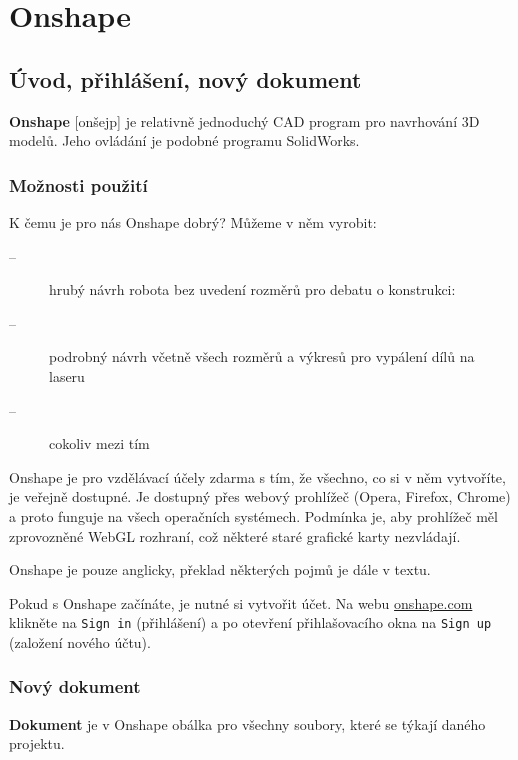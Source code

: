 
\section{Onshape} \label{onshape}

\subsection{Úvod, přihlášení, nový dokument}

\textbf{Onshape} 
 [onšejp] je relativně jednoduchý CAD program pro navrhování 3D modelů. Jeho ovládání je podobné programu SolidWorks. 
 
 \subsubsection{Možnosti použití}
 
 K čemu je pro nás Onshape dobrý? Můžeme v něm vyrobit: 
 
 \begin{description}
 	\item[--] hrubý návrh robota bez uvedení rozměrů pro debatu o konstrukci: 
 	\item[--] podrobný návrh včetně všech rozměrů a výkresů pro vypálení dílů na laseru  
 	\item[--] cokoliv mezi tím
 \end{description}
 
 
Onshape je pro vzdělávací účely zdarma s tím, že všechno, co si v něm vytvoříte, je veřejně dostupné. 
Je dostupný přes webový prohlížeč (Opera, Firefox, Chrome) a proto funguje na všech operačních systémech. 
Podmínka je, aby prohlížeč měl zprovozněné WebGL rozhraní, což některé staré grafické karty nezvládají. 

Onshape je pouze anglicky, překlad některých pojmů je dále v textu.

Pokud s Onshape začínáte, je nutné si vytvořit účet. 
Na webu \url{onshape.com} klikněte na {\tt Sign in} (přihlášení) a po otevření přihlašovacího okna na {\tt Sign up} (založení nového účtu).


\subsubsection{Nový dokument}


\textbf{Dokument} je v Onshape obálka pro všechny soubory, které se týkají daného projektu. 

